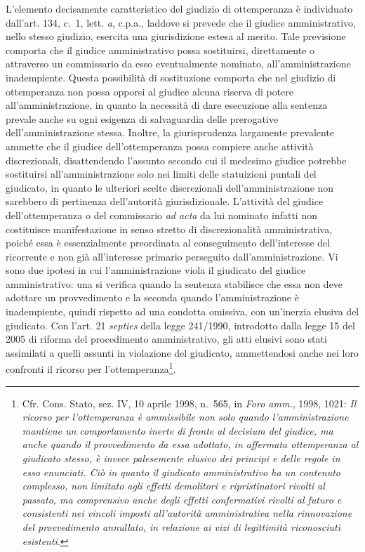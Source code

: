 \documentclass[12pt,it,a4paper,]{report}
\begin{document}
L'elemento decisamente caratteristico del giudizio di ottemperanza è
individuato dall'art. 134, c.~1, lett. \emph{a}, c.p.a., laddove si
prevede che il giudice amministrativo, nello stesso giudizio, esercita
una giurisdizione estesa al merito. Tale previsione comporta che il
giudice amministrativo possa sostituirsi, direttamente o attraverso un
commissario da esso eventualmente nominato, all'amministrazione
inadempiente. Questa possibilità di sostituzione comporta che nel
giudizio di ottemperanza non possa opporsi al giudice alcuna riserva di
potere all'amministrazione, in quanto la necessità di dare esecuzione
alla sentenza prevale anche su ogni esigenza di salvaguardia delle
prerogative dell'amministrazione stessa. Inoltre, la giurisprudenza
largamente prevalente ammette che il giudice dell'ottemperanza possa
compiere anche attività discrezionali, disattendendo l'assunto secondo
cui il medesimo giudice potrebbe sostituirsi all'amministrazione solo
nei limiti delle statuizioni puntali del giudicato, in quanto le
ulteriori scelte discrezionali dell'amministrazione non sarebbero di
pertinenza dell'autorità giurisdizionale. L'attività del giudice
dell'ottemperanza o del commissario \emph{ad acta} da lui nominato
infatti non costituisce manifestazione in senso stretto di
discrezionalità amministrativa, poiché essa è essenzialmente preordinata
al conseguimento dell'interesse del ricorrente e non già all'interesse
primario perseguito dall'amministrazione. Vi sono due ipotesi in cui
l'amministrazione viola il giudicato del giudice amministrativo: una si
verifica quando la sentenza stabilisce che essa non deve adottare un
provvedimento e la seconda quando l'amministrazione è inadempiente,
quindi rispetto ad una condotta omissiva, con un'inerzia elusiva del
giudicato. Con l'art. 21 \emph{septies} della legge 241/1990, introdotto
dalla legge 15 del 2005 di riforma del procedimento amministrativo, gli
atti elusivi sono stati assimilati a quelli assunti in violazione del
giudicato, ammettendosi anche nei loro confronti il ricorso per
l'ottemperanza\footnote{Cfr. Cons. Stato, sez. IV, 10 aprile 1998,
  n.~565, in \emph{Foro amm.}, 1998, 1021: \emph{Il ricorso per
  l'ottemperanza è ammissibile non solo quando l'amministrazione
  mantiene un comportamento inerte di fronte al decisium del giudice, ma
  anche quando il provvedimento da essa adottato, in affermata
  ottemperanza al giudicato stesso, è invece palesemente elusivo dei
  principi e delle regole in esso enunciati. Ciò in quanto il giudicato
  amministrativo ha un contenuto complesso, non limitato agli effetti
  demolitori e ripristinatori rivolti al passato, ma comprensivo anche
  degli effetti confermativi rivolti al futuro e consistenti nei vincoli
  imposti all'autorità amministrativa nella rinnovazione del
  provvedimento annullato, in relazione ai vizi di legittimità
  riconosciuti esistenti}.}.
\end{document}
